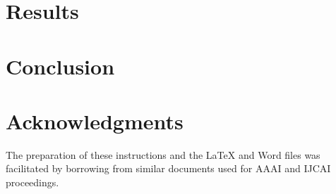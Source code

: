 \documentclass[letterpaper]{article}
\begin{document}
\section{Results}

\section{Conclusion}

\section{Acknowledgments}

The preparation of these instructions and the \LaTeX{} and Word files was 
facilitated by borrowing from similar documents used for AAAI and IJCAI proceedings.










\end{document}
